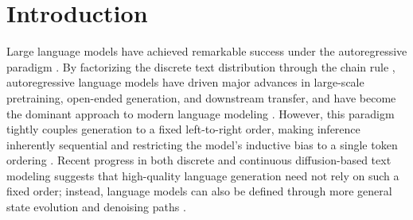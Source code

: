 \section{Introduction}

Large language models have achieved remarkable success under the autoregressive paradigm \citep{brown2020language,guo2025deepseek,liu2024deepseekv2,hurst2024gpt,team2026kimi}. By factorizing the discrete text distribution through the chain rule \citep{malach2023auto,barrault2024large,katharopoulos2020transformers,hutchins2022block,du2022glm,yang2019xlnet}, autoregressive language models have driven major advances in large-scale pretraining, open-ended generation, and downstream transfer, and have become the dominant approach to modern language modeling \citep{pan2025survey,minaee2024large,chang2024survey,wan2023efficient,zhao2023survey}. However, this paradigm tightly couples generation to a fixed left-to-right order, making inference inherently sequential and restricting the model’s inductive bias to a single token ordering \citep{bachmann2024pitfalls,wu2025constrained,li2025beyond,monea2023pass,aishwarya2024tandem,fu2024break,you2024linear}. Recent progress in both discrete and continuous diffusion-based text modeling suggests that high-quality language generation need not rely on such a fixed order; instead, language models can also be defined through more general state evolution and denoising paths \citep{ye2024beyond,yu2025dimple,ou2024your,strudel2022self,chen2025dlm,mahabadi2024tess}.


